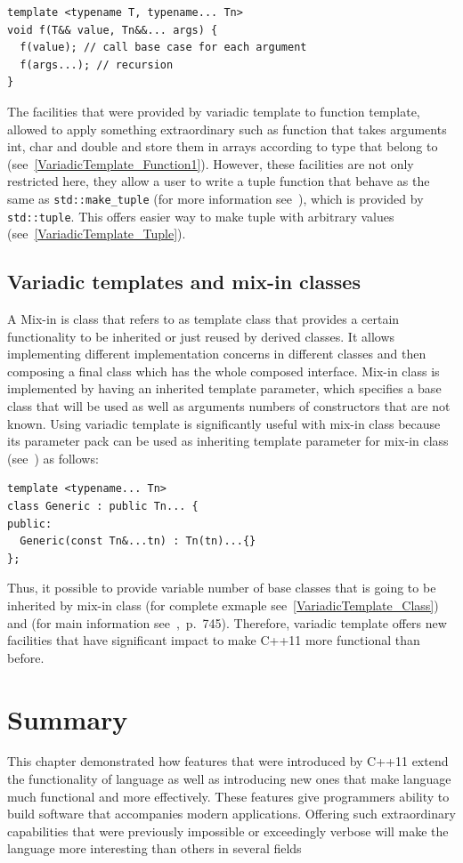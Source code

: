 \documentclass[11pt]{report}
\begin{document}
\begin{lstlisting}
template <typename T, typename... Tn>
void f(T&& value, Tn&&... args) {
  f(value); // call base case for each argument
  f(args...); // recursion
}
\end{lstlisting}
The facilities that were provided by variadic template to function template, allowed to apply something extraordinary such as function that takes arguments int, char and double and store them in arrays according to type that belong to (see~\ref{VariadicTemplate_Function1}). However, these facilities are not only restricted here, they allow a user to write a tuple function that behave as the same as \texttt{std::make\_tuple} (for more information see~\cite{Stroustrup:2012:Cpp11}), which is provided by \texttt{std::tuple}. This offers easier way to make tuple with arbitrary values (see~\ref{VariadicTemplate_Tuple}).


\subsection{Variadic templates and mix-in classes}
\label{subsection: Variadic Templates and Mix-In Classes}
A Mix-in is class that refers to as template class that provides a certain functionality to be inherited or just reused by derived classes. It allows implementing different implementation concerns in different classes and then composing a final class which has the whole composed interface. Mix-in class is implemented by having an inherited template parameter, which specifies a base class that will be used as well as arguments numbers of constructors that are not known. Using variadic template is significantly useful with mix-in class because its parameter pack can be used as inheriting template parameter for mix-in class (see~\cite{Gregor:2007:VTC}) as follows:
\begin{lstlisting}
template <typename... Tn>
class Generic : public Tn... {
public:
  Generic(const Tn&...tn) : Tn(tn)...{}
};
\end{lstlisting}
Thus, it possible to provide variable number of base classes that is going to be inherited by mix-in class (for complete exmaple see~\ref{VariadicTemplate_Class}) and (for main information see~\cite{Gregorie:professionalcpp},~p.~745). Therefore, variadic template offers new facilities that have significant impact to make C++11 more functional than before.

\section{Summary}
\label{section1: Summary}
This chapter demonstrated how features that were introduced by C++11 extend the functionality of language as well as introducing new ones that make language much functional and more effectively. These features give programmers ability to build software that accompanies modern applications. Offering such extraordinary capabilities that were previously impossible or exceedingly verbose will make the language more interesting than others in several fields
\end{document}
